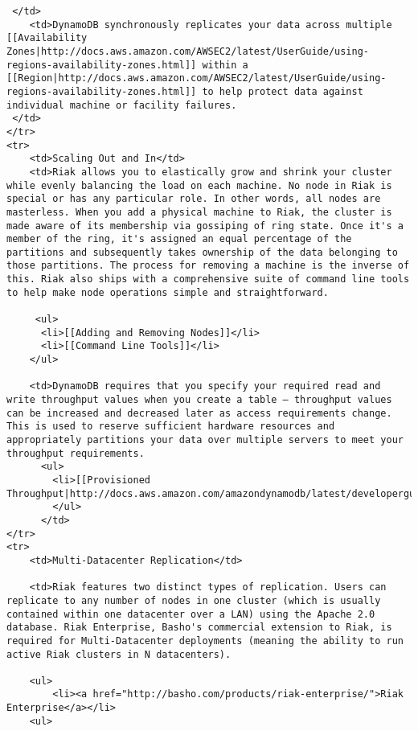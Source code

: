 \documentclass[letter]{book}
\newcounter{tab}[chapter]
\begin{document}
\begin{shaded}
\begin{verbatim}
 </td>
    <td>DynamoDB synchronously replicates your data across multiple [[Availability Zones|http://docs.aws.amazon.com/AWSEC2/latest/UserGuide/using-regions-availability-zones.html]] within a [[Region|http://docs.aws.amazon.com/AWSEC2/latest/UserGuide/using-regions-availability-zones.html]] to help protect data against individual machine or facility failures.
 </td>
</tr>
<tr>
    <td>Scaling Out and In</td>
    <td>Riak allows you to elastically grow and shrink your cluster while evenly balancing the load on each machine. No node in Riak is special or has any particular role. In other words, all nodes are masterless. When you add a physical machine to Riak, the cluster is made aware of its membership via gossiping of ring state. Once it's a member of the ring, it's assigned an equal percentage of the partitions and subsequently takes ownership of the data belonging to those partitions. The process for removing a machine is the inverse of this. Riak also ships with a comprehensive suite of command line tools to help make node operations simple and straightforward.

     <ul>
      <li>[[Adding and Removing Nodes]]</li>
      <li>[[Command Line Tools]]</li>
    </ul>

    <td>DynamoDB requires that you specify your required read and write throughput values when you create a table – throughput values can be increased and decreased later as access requirements change. This is used to reserve sufficient hardware resources and appropriately partitions your data over multiple servers to meet your throughput requirements.
      <ul>
        <li>[[Provisioned Throughput|http://docs.aws.amazon.com/amazondynamodb/latest/developerguide/ProvisionedThroughputIntro.html]]
        </ul>
      </td>
</tr>
<tr>
    <td>Multi-Datacenter Replication</td>

    <td>Riak features two distinct types of replication. Users can replicate to any number of nodes in one cluster (which is usually contained within one datacenter over a LAN) using the Apache 2.0 database. Riak Enterprise, Basho's commercial extension to Riak, is required for Multi-Datacenter deployments (meaning the ability to run active Riak clusters in N datacenters).

    <ul>
        <li><a href="http://basho.com/products/riak-enterprise/">Riak Enterprise</a></li>
    <ul>


\end{verbatim}
\end{shaded}
\end{document}
